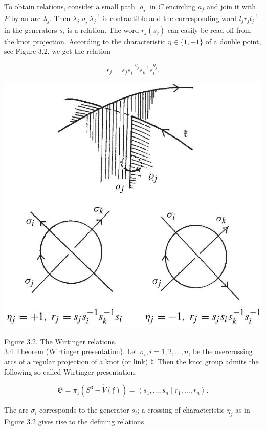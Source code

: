 \documentclass[10pt, letterpaper]{article}
\begin{document}
To obtain relations, consider a small path $\varrho_{j}$ in $C$ encircling $a_{j}$ and join it with $P$ by an arc $\lambda_{j}$. Then $\lambda_{j} \varrho_{j} \lambda_{j}^{-1}$ is contractible and the corresponding word $l_{j} r_{j} l_{j}^{-1}$ in the generators $s_{i}$ is a relation. The word $r_{j}\left(s_{j}\right)$ can easily be read off from the knot projection. According to the characteristic $\eta \in\{1,-1\}$ of a double point, see Figure 3.2, we get the relation

$$
r_{j}=s_{j} s_{i}^{-\eta_{j}} s_{k}^{-1} s_{i}^{\eta_{j}} .
$$

\begin{center}
\includegraphics[scale=0.2]{2025_05_21_9c06be8de7a55410f8c1g-047}
\end{center}

Figure 3.2. The Wirtinger relations.\\
3.4 Theorem (Wirtinger presentation). Let $\sigma_{i}, i=1,2, \ldots, n$, be the overcrossing arcs of a regular projection of a knot (or link) $\mathfrak{k}$. Then the knot group admits the following so-called Wirtinger presentation:

$$
\mathfrak{G}=\pi_{1}\left(\overline{S^{3}-V(\mathfrak{f})}\right)=\left\langle s_{1}, \ldots, s_{n} \mid r_{1}, \ldots, r_{n}\right\rangle .
$$

The arc $\sigma_{i}$ corresponds to the generator $s_{i}$; a crossing of characteristic $\eta_{j}$ as in Figure 3.2 gives rise to the defining relations
\end{document}
